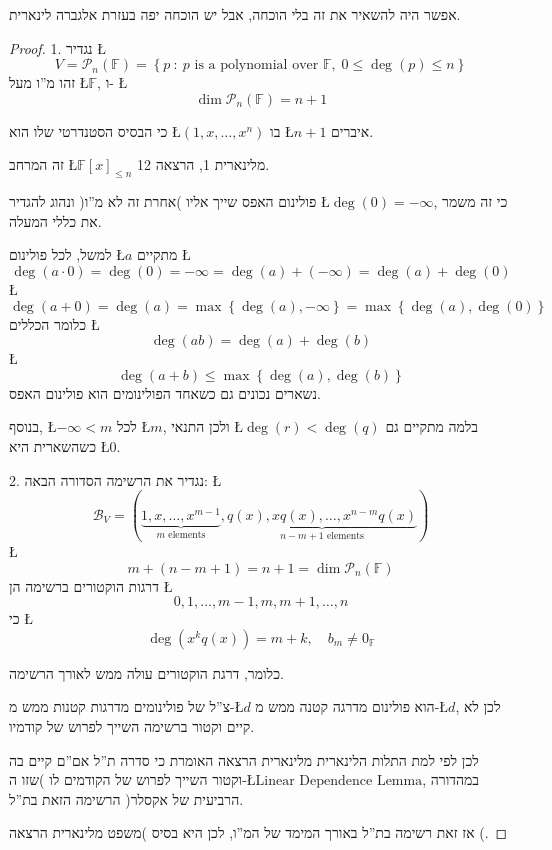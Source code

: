 \documentclass[english,hebrew]{article}
\begin{document}
אפשר היה להשאיר את זה בלי הוכחה, אבל יש הוכחה יפה בעזרת אלגברה לינארית.
\begin{proof}
1. נגדיר \L{%
\[
V=\mathcal{P}_{n}(\mathbb{F})=\left\{ p\::\:p\text{ is a polynomial over }\mathbb{F},\;0\leq\deg(p)\leq n\right\} 
\]
}%
זהו מ\textquotedblright ו מעל \L{$\mathbb{F}$}, ו- \L{%
\[
\dim\mathcal{P}_{n}(\mathbb{F})=n+1
\]
}%

כי הבסיס הסטנדרטי שלו הוא \L{$\left(1,x,\dots,x^{n}\right)$} בו \L{$n+1$}
איברים.

זה המרחב \L{$\mathbb{F}[x]_{\le n}$} מלינארית 1, הרצאה 12.

פולינום האפס שייך אליו )אחרת זה לא מ\textquotedblright ו( ונהוג להגדיר
\L{$\deg(0)=-\infty$}, כי זה משמר את כללי המעלה.

למשל, לכל פולינום \L{$a$} מתקיים \L{%
\[
\deg(a\cdot0)=\deg(0)=-\infty=\deg(a)+(-\infty)=\deg(a)+\deg(0)
\]
}%
\L{%
\[
\deg(a+0)=\deg(a)=\max\left\{ \deg(a),-\infty\right\} =\max\left\{ \deg(a),\deg(0)\right\} 
\]
}%
כלומר הכללים \L{%
\[
\deg(ab)=\deg(a)+\deg(b)
\]
}%
\L{%
\[
\deg(a+b)\le\max\left\{ \deg(a),\deg(b)\right\} 
\]
}%
נשארים נכונים גם כשאחד הפולינומים הוא פולינום האפס.

בנוסף, \L{$-\infty<m$} לכל \L{$m$}, ולכן התנאי \L{$\deg(r)<\deg(q)$}
בלמה מתקיים גם כשהשארית היא \L{$0$}.

2. נגדיר את הרשימה הסדורה הבאה: \L{%
\[
\mathcal{B}_{V}=\left(\underbrace{1,x,\dots,x^{m-1}}_{m\text{ elements}},\underbrace{q(x),xq(x),\dots,x^{n-m}q(x)}_{n-m+1\text{ elements}}\right)
\]
}%
\L{%
\[
m+(n-m+1)=n+1=\dim\mathcal{P}_{n}(\mathbb{F})
\]
}%
דרגות הוקטורים ברשימה הן \L{%
\[
0,1,\dots,m-1,m,m+1,\dots,n
\]
}%
 כי \L{%
\[
\deg\left(x^{k}q(x)\right)=m+k,\quad b_{m}\ne0_{\mathbb{F}}
\]
}%

כלומר, דרגת הוקטורים עולה ממש לאורך הרשימה.

צ\textquotedblright ל של פולינומים מדרגות קטנות ממש מ-\L{$d$} הוא
פולינום מדרגה קטנה ממש מ-\L{$d$}, לכן לא קיים וקטור ברשימה השייך
לפרוש של קודמיו.

לכן לפי למת התלות הלינארית מלינארית {\endL} הרצאה {\endL}
האומרת כי סדרה ת\textquotedblright ל אם\textquotedblright ם קיים בה
וקטור השייך לפרוש של הקודמים לו )שזו ה-\L{$\text{Linear Dependence Lemma}$},
{\endL} במהדורה הרביעית של אקסלר( הרשימה הזאת בת\textquotedblright ל.

אז זאת רשימה בת\textquotedblright ל באורך המימד של המ\textquotedblright ו,
לכן היא בסיס )משפט מלינארית {\endL} הרצאה {\endL}(. 


\end{proof}
\end{document}
